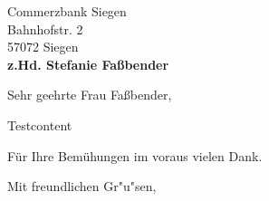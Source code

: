 \documentclass[12pt,tikz]{dinbrief}
\begin{document}
\begin{letter}{Commerzbank Siegen\\
Bahnhofstr. 2\\
57072 Siegen\\
[\medskipamount]
{\bf z.Hd. Stefanie Faßbender}}
\subject{Testbetreff}

\nowindowrules
\opening{Sehr geehrte Frau Faßbender,}
Testcontent

Für Ihre Bemühungen im voraus vielen Dank.
\closing{Mit freundlichen Gr"u"sen,}
\end{letter}
\end{document}

